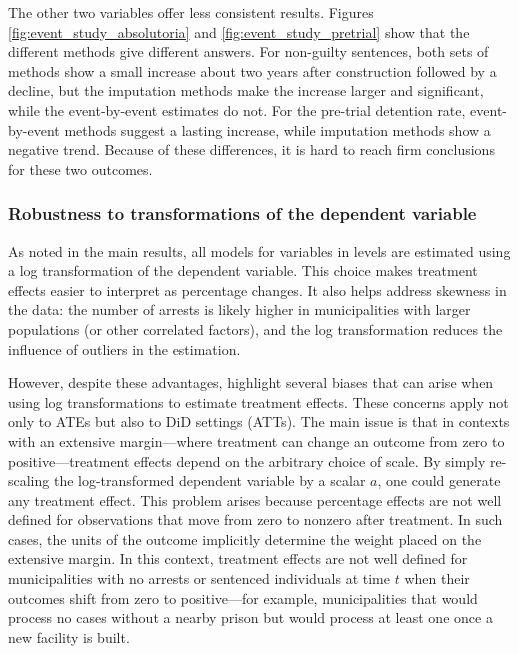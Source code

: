 The other two variables offer less consistent results. Figures \ref{fig:event_study_absolutoria} and \ref{fig:event_study_pretrial} show that the different methods give different answers. For non-guilty sentences, both sets of methods show a small increase about two years after construction followed by a decline, but the imputation methods make the increase larger and significant, while the event-by-event estimates do not. For the pre-trial detention rate, event-by-event methods suggest a lasting increase, while imputation methods show a negative trend. Because of these differences, it is hard to reach firm conclusions for these two outcomes. 

\subsubsection*{Robustness to transformations of the dependent variable}
\label{sec:robust_log}
As noted in the main results, all models for variables in levels are estimated using a log transformation of the dependent variable. This choice makes treatment effects easier to interpret as percentage changes. It also helps address skewness in the data: the number of arrests is likely higher in municipalities with larger populations (or other correlated factors), and the log transformation reduces the influence of outliers in the estimation.

However, despite these advantages, \cite{ChenRoth2024} highlight several biases that can arise when using log transformations to estimate treatment effects. These concerns apply not only to ATEs but also to DiD settings (ATTs). The main issue is that in contexts with an extensive margin—where treatment can change an outcome from zero to positive—treatment effects depend on the arbitrary choice of scale. By simply re-scaling the log-transformed dependent variable by a scalar $a$, one could generate any treatment effect. This problem arises because percentage effects are not well defined for observations that move from zero to nonzero after treatment. In such cases, the units of the outcome implicitly determine the weight placed on the extensive margin. In this context, treatment effects are not well defined for municipalities with no arrests or sentenced individuals at time $t$ when their outcomes shift from zero to positive—for example, municipalities that would process no cases without a nearby prison but would process at least one once a new facility is built.


